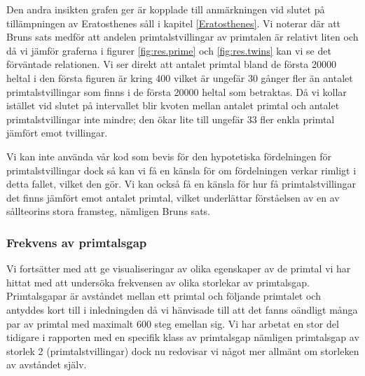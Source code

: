 Den andra insikten grafen ger är kopplade till anmärkningen vid slutet på tillämpningen av Eratosthenes såll i kapitel \ref{Eratosthenes}. Vi noterar där att Bruns sats medför att andelen primtalstvillingar av primtalen är relativt liten och då vi jämför graferna i figurer \ref{fig:res.prime} och \ref{fig:res.twins} kan vi se det förväntade relationen.
Vi ser direkt att antalet primtal bland de första 20000 heltal i den första figuren är kring 400 vilket är ungefär 30 gånger fler än antalet primtalstvillingar som finns i de första 20000 heltal som betraktas.
Då vi kollar istället vid slutet på intervallet blir kvoten mellan antalet primtal och antalet primtalstvillingar inte mindre; den ökar lite till ungefär 33 fler enkla primtal jämfört emot tvillingar.

Vi kan inte använda vår kod som bevis för den hypotetiska fördelningen för primtalstvillingar dock så kan vi få en känsla för om fördelningen verkar rimligt i detta fallet, vilket den gör. Vi kan också få en känsla för hur få primtalstvillingar det finns jämfört emot antalet primtal, vilket underlättar förståelsen av en av sållteorins stora framsteg, nämligen Bruns sats.


\subsubsection{Frekvens av primtalsgap}

Vi fortsätter med att ge visualiseringar av olika egenskaper av de primtal vi har hittat med att undersöka frekvensen av olika storlekar av primtalsgap. 
Primtalsgapar är avståndet mellan ett primtal och följande primtalet och antyddes kort till i inledningden då vi hänvisade till att det fanns oändligt många par av primtal med maximalt 600 steg emellan sig.
Vi har arbetat en stor del tidigare i rapporten med en specifik klass av primtalsgap nämligen primtalsgap av storlek 2 (primtalstvillingar) dock nu redovisar vi något mer allmänt om storleken av avståndet själv.


